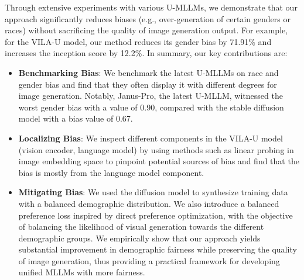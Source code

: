 Through extensive experiments with various U-MLLMs, we demonstrate that our approach significantly reduces biases (e.g., over-generation of certain genders or races) without sacrificing the quality of image generation output. For example, for the VILA-U model, our method reduces its gender bias by 71.91\% and increases the inception score by 12.2\%. In summary, our key contributions are:
\vspace{-1em}
\begin{itemize}[leftmargin=*]
    \item \textbf{Benchmarking Bias}: We benchmark the latest U-MLLMs on race and gender bias and find that they often display it with different degrees for image generation. Notably, Janus-Pro, the latest U-MLLM, witnessed the worst gender bias with a value of 0.90, compared with the stable diffusion model with a bias value of 0.67.
    \item \textbf{Localizing Bias}: We inspect different components in the VILA-U model (vision encoder, language model) by using methods such as linear probing in image embedding space to pinpoint potential sources of bias and find that the bias is mostly from the language model component.
    \item  \textbf{Mitigating Bias}: We used the diffusion model to synthesize training data with a balanced demographic distribution. We also introduce a balanced preference loss inspired by direct preference optimization, with the objective of balancing the likelihood of visual generation towards the different demographic groups. We empirically show that our approach yields substantial improvement in demographic fairness while preserving the quality of image generation, thus providing a practical framework for developing unified MLLMs with more fairness.
\end{itemize}
